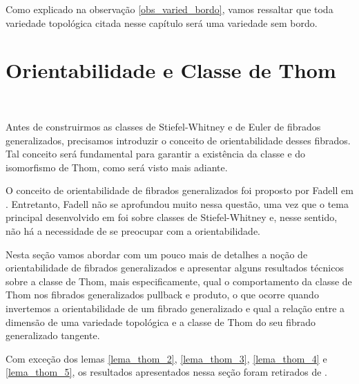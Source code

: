 \documentclass[12pt,oneside]{book} %
\begin{document}
\par Como explicado na observação \ref{obs_varied_bordo}, vamos ressaltar que toda variedade topológica citada nesse capítulo será uma variedade sem bordo.





\section{Orientabilidade e Classe de Thom}\label{secao_thom}

\

\par Antes de construirmos as classes de Stiefel-Whitney e de Euler de fibrados generalizados, precisamos introduzir o conceito de orientabilidade desses fibrados. Tal conceito será fundamental para garantir a existência da classe e do isomorfismo de Thom, como será visto mais adiante.

\par O conceito de orientabilidade de fibrados generalizados foi proposto por Fadell em \cite{fadell_1}. Entretanto, Fadell não se aprofundou muito nessa questão, uma vez que o tema principal desenvolvido em \cite{fadell_1} foi sobre classes de Stiefel-Whitney e, nesse sentido, não há a necessidade de se preocupar com a orientabilidade.

\par Nesta seção vamos abordar com um pouco mais de detalhes a noção de orientabilidade de fibrados generalizados e apresentar alguns resultados técnicos sobre a classe de Thom, mais especificamente, qual o comportamento da classe de Thom nos fibrados generalizados pullback e produto, o que ocorre quando invertemos a orientabilidade de um fibrado generalizado e qual a relação entre a dimensão de uma variedade topológica e a classe de Thom do seu fibrado generalizado tangente.

\par Com exceção dos lemas \ref{lema_thom_2}, \ref{lema_thom_3}, \ref{lema_thom_4} e \ref{lema_thom_5}, os resultados apresentados nessa seção foram retirados de \cite{fadell_1}.
\end{document}
